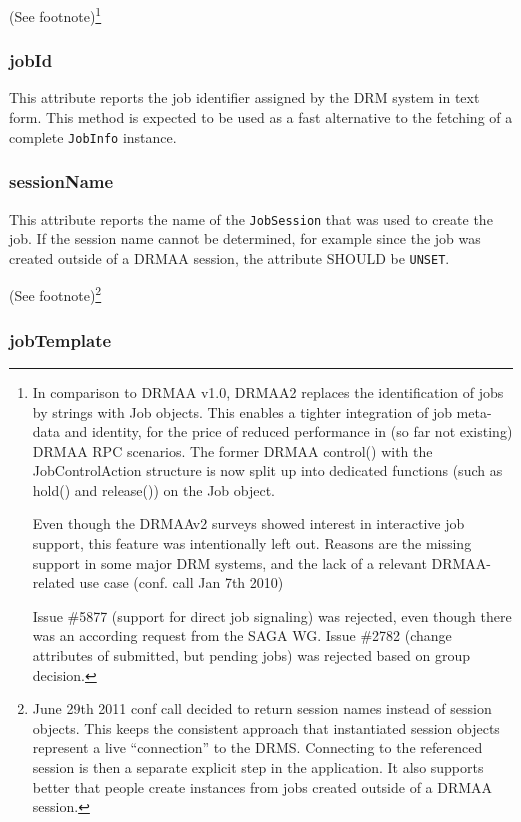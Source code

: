 \documentclass{article}
\newcommand{\h}[1]{\lstinline|#1|}
\newcommand{\rat}[1]{ {\tiny(See footnote)}\footnote{#1} }
\begin{document}


\rat{
In comparison to DRMAA v1.0, DRMAA2 replaces the identification of jobs by strings with Job objects. This enables a tighter integration of job meta-data and identity, for the price of reduced performance in (so far not existing) DRMAA RPC scenarios. The former DRMAA control() with the JobControlAction structure is now split up into dedicated functions (such as hold() and release()) on the Job object.
	
Even though the DRMAAv2 surveys showed interest in interactive job support, this feature was intentionally left out. Reasons are the missing support in some major DRM systems, and the lack of a relevant DRMAA-related use case (conf. call Jan 7th 2010)

Issue \#5877 (support for direct job signaling) was rejected, even though there was an according request from the SAGA WG. Issue \#2782 (change attributes of submitted, but pending jobs) was rejected based on group decision.
}

\subsubsection{jobId}

This attribute reports the job identifier assigned by the DRM system in text form. This method is expected to be used as a fast alternative to the fetching of a complete \h{JobInfo} instance.

\subsubsection{sessionName}

This attribute reports the name of the \h{JobSession} that was used to create the job. If the session name cannot be determined, for example since the job was created outside of a DRMAA session, the attribute SHOULD be \h{UNSET}.

\rat{June 29th 2011 conf call decided to return session names instead of session objects. This keeps the consistent approach that instantiated session objects represent a live ``connection'' to the DRMS. Connecting to the referenced session is then a separate explicit step in the application. It also supports better that people create instances from jobs created outside of a DRMAA session.
}

\subsubsection{jobTemplate}
\end{document}
